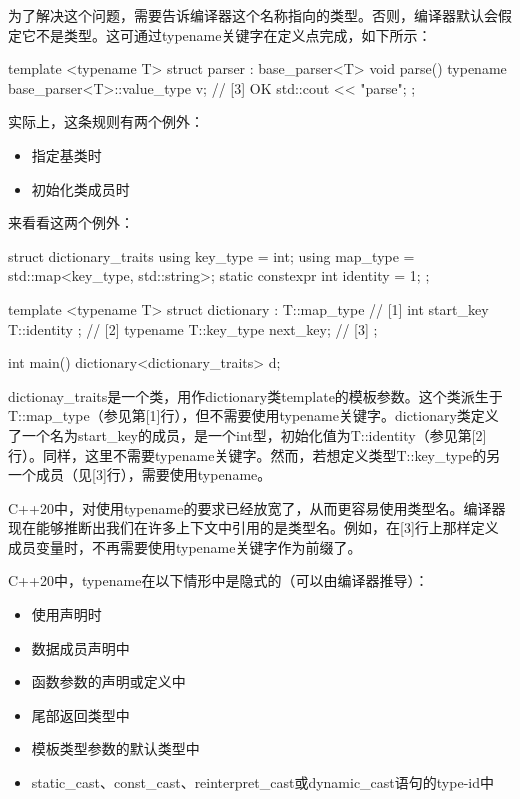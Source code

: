 为了解决这个问题，需要告诉编译器这个名称指向的类型。否则，编译器默认会假定它不是类型。这可通过typename关键字在定义点完成，如下所示：

\begin{cpp}
template <typename T>
struct parser : base_parser<T>
{
	void parse()
	{
		typename base_parser<T>::value_type v{}; // [3] OK
		std::cout << "parse\n";
	}
};
\end{cpp}

实际上，这条规则有两个例外：

\begin{itemize}
\item
指定基类时

\item
初始化类成员时
\end{itemize}

来看看这两个例外：

\begin{cpp}
struct dictionary_traits
{
	using key_type = int;
	using map_type = std::map<key_type, std::string>;
	static constexpr int identity = 1;
};

template <typename T>
struct dictionary : T::map_type // [1]
{
	int start_key { T::identity }; // [2]
	typename T::key_type next_key; // [3]
};

int main()
{
	dictionary<dictionary_traits> d;
}
\end{cpp}

dictionay\_traits是一个类，用作dictionary类template的模板参数。这个类派生于T::map\_type（参见第[1]行），但不需要使用typename关键字。dictionary类定义了一个名为start\_key的成员，是一个int型，初始化值为T::identity（参见第[2]行）。同样，这里不需要typename关键字。然而，若想定义类型T::key\_type的另一个成员（见[3]行），需要使用typename。

C++20中，对使用typename的要求已经放宽了，从而更容易使用类型名。编译器现在能够推断出我们在许多上下文中引用的是类型名。例如，在[3]行上那样定义成员变量时，不再需要使用typename关键字作为前缀了。

C++20中，typename在以下情形中是隐式的（可以由编译器推导）：

\begin{itemize}
\item
使用声明时

\item
数据成员声明中

\item
函数参数的声明或定义中

\item
尾部返回类型中

\item
模板类型参数的默认类型中

\item
static\_cast、const\_cast、reinterpret\_cast或dynamic\_cast语句的type-id中
\end{itemize}

